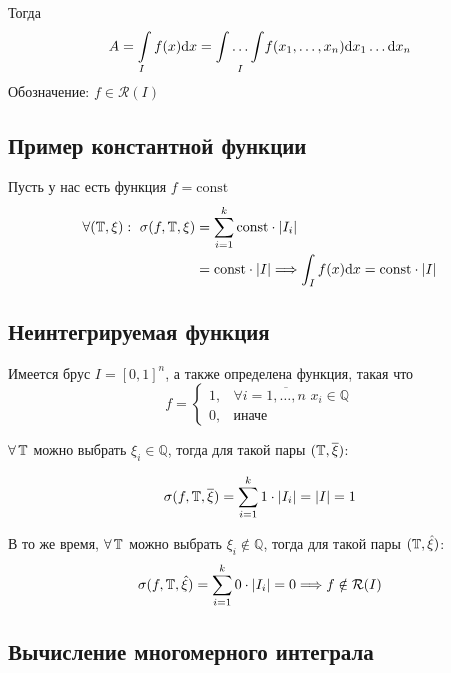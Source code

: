 Тогда 
$$A = \int\limits_If(x)\text{d}x = \underset{I}{\int\ldots\int}f(x_1, \ldots, x_n)\text{d}x_1\ldots \text{d}x_n$$
Обозначение: $f\in\mathcal{R}(I)$

\subsection{Пример константной функции}

Пусть у нас есть функция $f = \text{const}$
\begin{equation*}
\begin{aligned}
    \forall(\T, \xi):\ \sigma(f, \T, \xi)&= \sum_{i = 1}^k \text{const}\cdot|I_i|\\
    &= \text{const}\cdot|I| \Longrightarrow \int_I f(x)\d{x} = \text{const}\cdot|I|
    \end{aligned}
\end{equation*}

\subsection{Неинтегрируемая функция}

Имеется брус $I = [0, 1]^n$, а также определена функция, такая что
\begin{equation*}
    f = \begin{cases}
        1,& \forall i = \overline{1,\ldots, n}\,\, x_i\in \mathbb{Q}\\
        0,&\text{иначе}
    \end{cases}
\end{equation*}

\proof $\forall \operatorname{\mathbb{T}}$ можно выбрать $\xi_i\in \mathbb{Q}$, тогда для такой пары $(\operatorname{\mathbb{T}}, \overline{\xi})$:

\begin{equation*}
    \sigma(f, \T, \overline{\xi}) = \sum_{i=1}^k1\cdot|I_i| = |I| = 1
\end{equation*}

В то же время, $\forall \operatorname{\mathbb{T}}$ можно выбрать $\xi_i\notin \mathbb{Q}$, тогда для такой пары $(\operatorname{\mathbb{T}}, \hat{\xi})$:
\begin{equation*}
    \sigma(f, \T, \hat{\xi}) = \sum_{i=1}^k0\cdot|I_i| = 0 \Longrightarrow f\notin\mathcal{R}(I)
\end{equation*}

\subsection{Вычисление многомерного интеграла}


